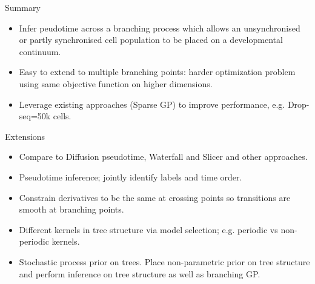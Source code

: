 \documentclass[ignorenonframetext]{beamer}
\begin{document}
   
\begin{frame}{Summary}
\begin{itemize}
\item Infer peudotime across a branching process which allows an unsynchronised or partly synchronised cell population to be placed on a developmental continuum.
\item Easy to extend to multiple branching points: harder optimization problem using same objective function on higher dimensions.
\item Leverage existing approaches (Sparse GP) to improve performance, e.g. Drop-seq=50k cells.
\end{itemize}
\end{frame}   

\begin{frame}{Extensions}
\begin{itemize}
\item Compare to Diffusion pseudotime, Waterfall and Slicer and other approaches.
\item Pseudotime inference; jointly identify labels and time order. 
\item Constrain derivatives to be the same at crossing points so transitions are smooth at branching points.
\item Different kernels in tree structure via model selection; e.g. periodic vs non-periodic kernels.
\item Stochastic process prior on trees. Place non-parametric prior on tree structure and perform inference on tree structure as well as branching GP.
\end{itemize}
\end{frame}    
\end{document}

